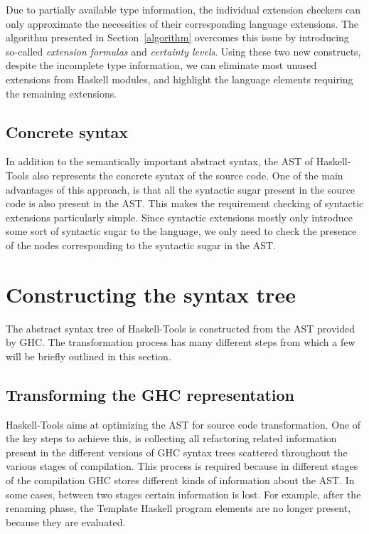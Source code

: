 \documentclass[main.tex]{subfiles}
\begin{document}
	Due to partially available type information, the individual extension checkers can only approximate the necessities of their corresponding language extensions. The algorithm presented in Section~\ref{algorithm} overcomes this issue by introducing so-called \emph{extension formulas} and \emph{certainty levels}. Using these two new constructs, despite the incomplete type information, we can eliminate most unused extensions from Haskell modules, and highlight the language elements requiring the remaining extensions.
	
	\subsection{Concrete syntax}
	
	In addition to the semantically important abstract syntax, the AST of Haskell-Tools also represents the concrete syntax of the source code. One of the main advantages of this approach, is that all the syntactic sugar present in the source code is also present in the AST. This makes the requirement checking of syntactic extensions particularly simple. Since syntactic extensions mostly only introduce some sort of syntactic sugar to the language, we only need to check the presence of the nodes corresponding to the syntactic sugar in the AST.
	
	\section{Constructing the syntax tree}
	
	The abstract syntax tree of Haskell-Tools is constructed from the AST provided by GHC. The transformation process has many different steps from which a few will be briefly outlined in this section.
	
	\subsection{Transforming the GHC representation}
	
	Haskell-Tools aims at optimizing the AST for source code transformation. One of the key steps to achieve this, is collecting all refactoring related information present in the different versions of GHC syntax trees scattered throughout the various stages of compilation. This process is required because in different stages of the compilation GHC stores different kinds of information about the AST. In some cases, between two stages certain information is lost. For example, after the renaming phase, the Template Haskell program elements are no longer present, because they are evaluated.
	
\end{document}
